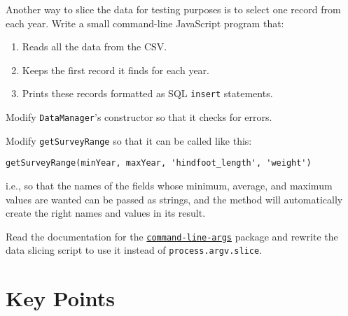
Another way to slice the data for testing purposes is to select one record from each year.
Write a small command-line JavaScript program that:

\begin{enumerate}
\item
  Reads all the data from the CSV.
\item
  Keeps the first record it finds for each year.
\item
  Prints these records formatted as SQL \texttt{insert} statements.
\end{enumerate}


Modify \texttt{DataManager}'s constructor so that it checks for errors.


Modify \texttt{getSurveyRange} so that it can be called like this:

\begin{verbatim}
getSurveyRange(minYear, maxYear, 'hindfoot_length', 'weight')
\end{verbatim}

\noindent
i.e., so that the names of the fields whose minimum, average, and maximum values are wanted
can be passed as strings,
and the method will automatically create the right names and values in its result.


Read the documentation for
the \href{https://www.npmjs.com/package/command-line-args}{\texttt{command-line-args}} package
and rewrite the data slicing script to use it instead of \texttt{process.argv.slice}.

\section*{Key Points}


